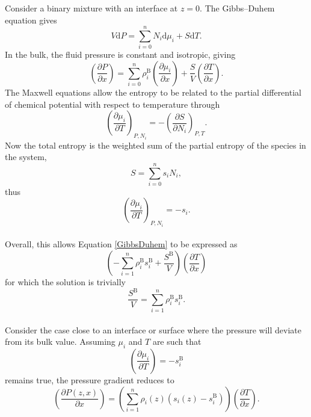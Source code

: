 Consider a binary mixture with an interface at $z=0$.
The Gibbs--Duhem equation gives
\begin{equation}
V \mathrm{d}P = \sum_{i=0}^{n} N_{i} \mathrm{d}\mu_{i} + S \mathrm{d}T.
\end{equation}
In the bulk, the fluid pressure is constant and isotropic, giving
\begin{equation}
\label{GibbsDuhem}
\left( \frac{\partial P}{\partial x}\right) = \sum_{i=0}^{n} \rho_{i}^{\mathrm{B}} \left(\frac{\partial \mu_{i}}{\partial x}\right) + \frac{S}{V} \left( \frac{\partial T}{\partial x}\right).
\end{equation}
The Maxwell equations allow the entropy to be related to the partial differential of chemical potential with respect to temperature through
\begin{equation}
\left( \frac{\partial\mu_{i}}{\partial T} \right)_{P,N_{i}} = - \left(\frac{\partial S}{\partial N_{i}}\right)_{P,T}.
\end{equation}
Now the total entropy is the weighted sum of the partial entropy of the species in the system, 
\begin{equation}
S = \sum_{i=0}^{n}s_{i}N_{i},
\end{equation}
thus
\begin{equation}
\left( \frac{\partial\mu_{i}}{\partial T} \right)_{P,N_{i}} = - s_{i}.
\end{equation}
\\
Overall, this allows Equation \ref{GibbsDuhem} to be expressed as
\begin{equation}
\left( - \sum_{i=1}^{n}\rho_{i}^{\mathrm{B}}s_{i}^{\mathrm{B}}+\frac{S^{\mathrm{B}}}{V}\right)\left(\frac{\partial T}{\partial x}\right)
\end{equation}
for which the solution is trivially 
\begin{equation}
\frac{S^{\mathrm{B}}}{V} = \sum_{i=1}^{n}\rho_{i}^{\mathrm{B}}s_{i}^{\mathrm{B}}.
\end{equation}
\\
Consider the case close to an interface or surface where the pressure will deviate from its bulk value.
Assuming $\mu_{i}$ and $T$ are such that
\begin{equation}
\left(\frac{\partial \mu_{i}}{\partial T}\right) = - s_{i}^{\mathrm{B}}
\end{equation}
remains true, the pressure gradient reduces to
\begin{equation}
\left(\frac{\partial P(z,x)}{\partial x}\right) = \left(\sum_{i=1}^{n}\rho_{i}(z)\left(s_{i}(z)-s_{i}^{\mathrm{B}}\right)\right)\left(\frac{\partial T}{\partial x}\right).
\end{equation}

